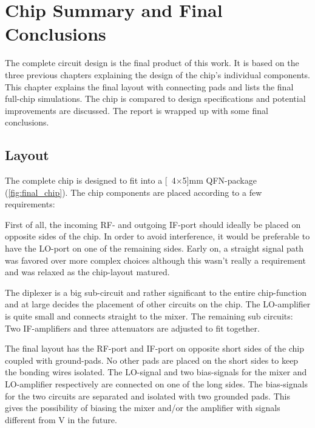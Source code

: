 \chapter{Chip Summary and Final Conclusions}
	
		The complete circuit design is the final product of this work. It is based on the three previous chapters explaining the design of the chip's individual components. This chapter explains the final layout with connecting pads and lists the final full-chip simulations. The chip is compared to design specifications and potential improvements are discussed. The report is wrapped up with some final conclusions.
		

	\section{Layout}
		The complete chip is designed to fit into a \unit[4$\times$5]{mm} QFN-package (\autoref{fig:final_chip}). The chip components are placed according to a few requirements:

		First of all, the incoming RF- and outgoing IF-port should ideally be placed on opposite sides of the chip. In order to avoid interference, it would be preferable to have the LO-port on one of the remaining sides. Early on, a straight signal path was favored over more complex choices although this wasn't really a requirement and was relaxed as the chip-layout matured. %

		The diplexer is a big sub-circuit and rather significant to the entire chip-function and at large decides the placement of other circuits on the chip. The LO-amplifier is quite small and connects straight to the mixer. The remaining sub circuits: Two IF-amplifiers and three attenuators are adjusted to fit together.

		The final layout has the RF-port and IF-port on opposite short sides of the chip coupled with ground-pads. No other pads are placed on the short sides to keep the bonding wires isolated. The LO-signal and two bias-signals for the mixer and LO-amplifier respectively are connected on one of the long sides. The bias-signals for the two circuits are separated and isolated with two grounded pads. This gives the possibility of biasing the mixer and/or the amplifier with signals different from \unit[5]{V} in the future.
	
